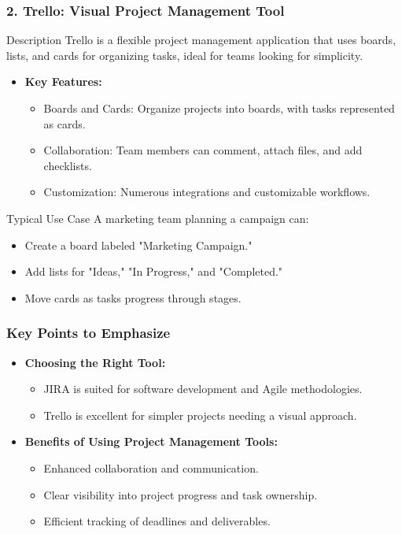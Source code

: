 \documentclass[aspectratio=169]{beamer}
\begin{document}
\begin{frame}[fragile]
    \frametitle{2. Trello: Visual Project Management Tool}
    \begin{block}{Description}
        Trello is a flexible project management application that uses boards, lists, and cards for organizing tasks, ideal for teams looking for simplicity.
    \end{block}
    \begin{itemize}
        \item \textbf{Key Features:}
        \begin{itemize}
            \item Boards and Cards: Organize projects into boards, with tasks represented as cards.
            \item Collaboration: Team members can comment, attach files, and add checklists.
            \item Customization: Numerous integrations and customizable workflows.
        \end{itemize}
    \end{itemize}
    \begin{block}{Typical Use Case}
        A marketing team planning a campaign can:
        \begin{itemize}
            \item Create a board labeled "Marketing Campaign."
            \item Add lists for "Ideas," "In Progress," and "Completed."
            \item Move cards as tasks progress through stages.
        \end{itemize}
    \end{block}
\end{frame}

\begin{frame}[fragile]
    \frametitle{Key Points to Emphasize}
    \begin{itemize}
        \item \textbf{Choosing the Right Tool:}
        \begin{itemize}
            \item JIRA is suited for software development and Agile methodologies.
            \item Trello is excellent for simpler projects needing a visual approach.
        \end{itemize}
        \item \textbf{Benefits of Using Project Management Tools:}
        \begin{itemize}
            \item Enhanced collaboration and communication.
            \item Clear visibility into project progress and task ownership.
            \item Efficient tracking of deadlines and deliverables.
        \end{itemize}
    \end{itemize}
\end{frame}
\end{document}
